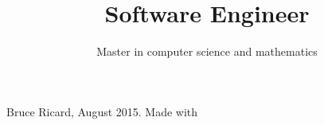 \documentclass{curve}
\title{Software Engineer}
\subtitle{Master in computer science and mathematics}
\begin{document}
\makeheaders[t]
\maketitle

\newpage
\makeheaders[t]


\vfill
\begin{center}
\tiny Bruce Ricard, August 2015. Made with \LaTeXe
\end{center}
\end{document}
